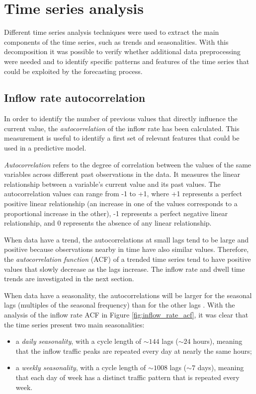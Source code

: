 \section{Time series analysis}
\label{sec:time_series_analysis}

Different time series analysis techniques were used to extract the main components of the time series, such as trends and seasonalities. With this decomposition it was possible to verify whether additional data preprocessing were needed and to identify specific patterns and features of the time series that could be exploited by the forecasting process.

\subsection{Inflow rate autocorrelation}
\label{subsec:inflow_rate_autocorrelation}

In order to identify the number of previous values that directly influence the current value, the \emph{autocorrelation} of the inflow rate has been calculated. This measurement is useful to identify a first set of relevant features that could be used in a predictive model.

\emph{Autocorrelation} refers to the degree of correlation between the values of the same variables across different past observations in the data. It measures the linear relationship between a variable's current value and its past values. The autocorrelation values can range from -1 to +1, where +1 represents a perfect positive linear relationship (an increase in one of the values corresponds to a proportional increase in the other), -1 represents a perfect negative linear relationship, and 0 represents the absence of any linear relationship.

When data have a trend, the autocorrelations at small lags tend to be large and positive because observations nearby in time have also similar values. Therefore, the \emph{autocorrelation function} (ACF) of a trended time series tend to have positive values that slowly decrease as the lags increase. The inflow rate and dwell time trends are investigated in the next section.

When data have a seasonality, the autocorrelations will be larger for the seasonal lags (multiples of the seasonal frequency) than for the other lags \cite{hyndman2018}. With the analysis of the inflow rate ACF in Figure \ref{fig:inflow_rate_acf}, it was clear that the time series present two main seasonalities:
\begin{itemize}
  \item a \emph{daily seasonality}, with a cycle length of \( {\sim}144 \) lags (\( {\sim}24 \) hours), meaning that the inflow traffic peaks are repeated every day at nearly the same hours;
  \item a \emph{weekly seasonality}, with a cycle length of \( {\sim}1008 \) lags (\( {\sim}7 \) days), meaning that each day of week has a distinct traffic pattern that is repeated every week.
\end{itemize}

